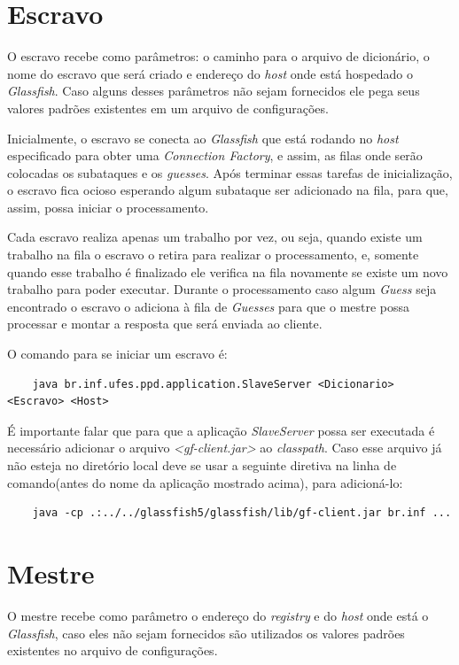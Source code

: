 \documentclass[
	12pt,				%
    oneside,			%
	a4paper,			%
	english,			%
	brazil,				%
	]{abntex2}
\begin{document}
\section{Escravo}
O escravo recebe como parâmetros: o caminho para o arquivo de dicionário, o nome do escravo que será criado e endereço do \textit{host} onde está hospedado o \textit{Glassfish}. Caso alguns desses parâmetros não sejam fornecidos ele pega seus valores padrões existentes em um arquivo de configurações.

Inicialmente, o escravo se conecta ao \textit{Glassfish} que está rodando no \textit{host} especificado para obter uma \textit{Connection Factory}, e assim, as filas onde serão colocadas os subataques e os \textit{guesses}. Após terminar essas tarefas de inicialização, o escravo fica ocioso esperando algum subataque ser adicionado na fila, para que, assim, possa iniciar o processamento. 

Cada escravo realiza apenas um trabalho por vez, ou seja, quando existe um trabalho na fila o escravo o retira para realizar o processamento, e, somente quando esse trabalho é finalizado ele verifica na fila novamente se existe um novo trabalho para poder executar. Durante o processamento caso algum \textit{Guess} seja encontrado o escravo o adiciona à fila de \textit{Guesses} para que o mestre possa processar e montar a resposta que será enviada ao cliente.

O comando para se iniciar um escravo é:

\begin{lstlisting}
	java br.inf.ufes.ppd.application.SlaveServer <Dicionario> <Escravo> <Host>
\end{lstlisting}

É importante falar que para que a aplicação \textit{SlaveServer} possa ser executada é necessário adicionar o arquivo \textit{<gf-client.jar>} ao \textit{classpath}. Caso esse arquivo já não esteja no diretório local deve se usar a seguinte diretiva na linha de comando(antes do nome da aplicação mostrado acima), para adicioná-lo:

\begin{lstlisting}
	java -cp .:../../glassfish5/glassfish/lib/gf-client.jar br.inf ...
\end{lstlisting}


\section{Mestre}

O mestre recebe como parâmetro o endereço do \textit{registry} e do \textit{host} onde está o \textit{Glassfish}, caso eles não sejam fornecidos são utilizados os valores padrões existentes no arquivo de configurações.
\end{document}

